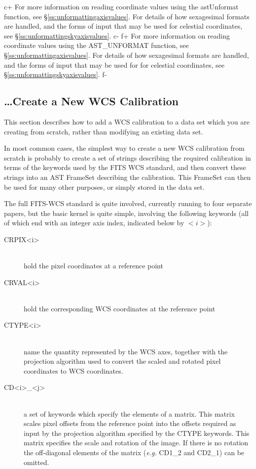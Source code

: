 \documentclass[twoside,11pt]{article}
\newcommand{\secref}[1]{\S\ref{#1}}
\newcommand{\secref}[1]{\ref{#1}}
\begin{document}
c+
For more information on reading coordinate values using the
astUnformat function, see \secref{ss:unformattingaxisvalues}. For
details of how sexagesimal formats are handled, and the forms of input
that may be used for celestial coordinates, see
\secref{ss:unformattingskyaxisvalues}.
c-
f+
For more information on reading coordinate values using the
AST\_UNFORMAT function, see \secref{ss:unformattingaxisvalues}. For
details of how sexagesimal formats are handled, and the forms of input
that may be used for for celestial coordinates, see
\secref{ss:unformattingskyaxisvalues}.
f-

\subsection{\label{ss:howtocreatenewwcs}\ldots Create a New WCS Calibration}

This section describes how to add a WCS calibration to a data set which you 
are creating from scratch, rather than modifying an existing data set. 

In most common cases, the simplest way to create a new WCS calibration
from scratch is probably to create a set of strings describing the
required calibration in terms of the keywords used by the FITS WCS
standard, and then convert these strings into an AST FrameSet describing
the calibration. This FrameSet can then be used for many other purposes, or
simply stored in the data set. 

The full FITS-WCS standard is quite involved, currently running to four
separate papers, but the basic kernel is quite simple, involving the
following keywords (all of which end with an integer axis index,
indicated below by $<i>$):

\begin{description}
\item[CRPIX<i>]\mbox{}\\
hold the pixel coordinates at a reference point 
\item[CRVAL<i>]\mbox{}\\
hold the corresponding WCS coordinates at the reference point 
\item[CTYPE<i>]\mbox{}\\
name the quantity represented by the WCS axes, together with the
projection algorithm used to convert the scaled and rotated pixel coordinates 
to WCS coordinates.
\item[CD<i>\_<j>]\mbox{}\\
a set of keywords which specify the elements of a matrix. This matrix scales
pixel offsets from the reference point into the offsets required as input
by the projection algorithm specified by the CTYPE keywords. This matrix 
specifies the scale and rotation of the image. If there is no rotation
the off-diagonal elements of the matrix (\emph{e.g.} CD1\_2 and
CD2\_1) can be omitted. 
\end{description}
\end{document}
